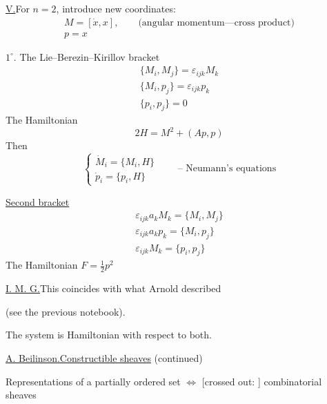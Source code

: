 \underline{V.}\quad For $n=2$, introduce new coordinates:
\begin{gather*}
M=[\dot x,x],\qquad\text{(angular momentum---cross product)}\\
p=x
\end{gather*}

$1^{\circ}$. The Lie--Berezin--Kirillov bracket
\begin{gather*}
\{M_i,M_j\}=\varepsilon_{ijk}M_k\\
\{M_i,p_j\}=\varepsilon_{ijk}p_k\\
\{p_i,p_j\}=0
\end{gather*}
The Hamiltonian
\begin{equation*}
2H=M^2+(Ap,p)
\end{equation*}
Then
\begin{equation*}
\begin{cases}
\dot M_i=\{M_i,H\}\\
\dot p_i=\{p_i,H\}
\end{cases}
\qquad\text{-- Neumann's equations}
\end{equation*}

\underline{Second bracket}
\begin{gather*}
\varepsilon_{ijk}a_kM_k=\{M_i,M_j\}\\
\varepsilon_{ijk}a_kp_k=\{M_i,p_j\}\\
\varepsilon_{ijk}M_k=\{p_i,p_j\}
\end{gather*}
The Hamiltonian $F=\frac12p^2$

\underline{I. M. G.}\quad This coincides with what Arnold described

(see the previous notebook).

The system is Hamiltonian with respect to both.


\underline{A. Beilinson.}\quad \underline{Constructible sheaves} (continued)

Representations of a partially ordered set $\Longleftrightarrow$
[crossed out: ]
combinatorial sheaves

\begin{center}
\end{center}

